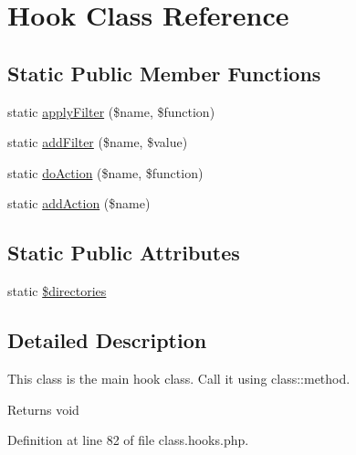 \hypertarget{class_hook}{\section{Hook Class Reference}
\label{class_hook}
}
\subsection*{Static Public Member Functions}
\begin{DoxyCompactItemize}
\item 
static \hyperlink{class_hook_abbc6b8e613d39304af45ffe38a2fa61b}{apply\-Filter} (\$name, \$function)
\item 
static \hyperlink{class_hook_a79d30e5023bd9d77404dc844dbd2e67a}{add\-Filter} (\$name, \$value)
\item 
static \hyperlink{class_hook_a8e1a4422f91d415e6bfa88c5c849b554}{do\-Action} (\$name, \$function)
\item 
static \hyperlink{class_hook_afff7a7869d2dd304043b69a3fff24655}{add\-Action} (\$name)
\end{DoxyCompactItemize}
\subsection*{Static Public Attributes}
\begin{DoxyCompactItemize}
\item 
static \hyperlink{class_hook_aca1cfea95d9874525c94ddc586b87633}{\$directories}
\end{DoxyCompactItemize}


\subsection{Detailed Description}
This class is the main hook class. Call it using class\-::method. 
 \begin{DoxyReturn}{Returns}
void 
\end{DoxyReturn}


Definition at line 82 of file class.\-hooks.\-php.



